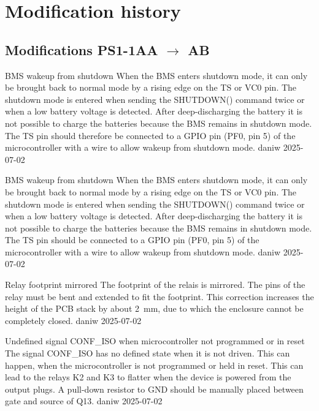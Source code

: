 \section{Modification history}

\subsection{Modifications PS1-1AA $\to$ AB}

\begin{ModTable}

\ModItemDone
{\acs{BMS} wakeup from shutdown}
{When the \ac{BMS} enters shutdown mode, it can only be brought back to normal mode by a rising edge on the TS or VC0 pin. The shutdown mode is entered when sending the SHUTDOWN() command twice or when a low battery voltage is detected. After deep-discharging the battery it is not possible to charge the batteries because the \ac{BMS} remains in shutdown mode. }
{The TS pin should therefore be connected to a GPIO pin (PF0, pin 5) of the microcontroller with a wire to allow wakeup from shutdown mode. }
{daniw}
{2025-07-02}

\ModItemDone
{\acs{BMS} wakeup from shutdown}
{When the \ac{BMS} enters shutdown mode, it can only be brought back to normal mode by a rising edge on the TS or VC0 pin. The shutdown mode is entered when sending the SHUTDOWN() command twice or when a low battery voltage is detected. After deep-discharging the battery it is not possible to charge the batteries because the \ac{BMS} remains in shutdown mode. }
{The TS pin should be connected to a GPIO pin (PF0, pin 5) of the microcontroller with a wire to allow wakeup from shutdown mode. }
{daniw}
{2025-07-02}

\ModItemDone
{Relay footprint mirrored}
{The footprint of the relais is mirrored. }
{The pins of the relay must be bent and extended to fit the footprint. This correction increases the height of the PCB stack by about \qty{2}{\milli\meter}, due to which the enclosure cannot be completely closed. }
{daniw}
{2025-07-02}

\ModItemDone
{Undefined signal CONF\_ISO when microcontroller not programmed or in reset}
{The signal CONF\_ISO has no defined state when it is not driven. This can happen, when the microcontroller is not programmed or held in reset. This can lead to the relays K2 and K3 to flatter when the device is powered from the output plugs. }
{A pull-down resistor to GND should be manually placed between gate and source of Q13. }
{daniw}
{2025-07-02}


\end{ModTable}
